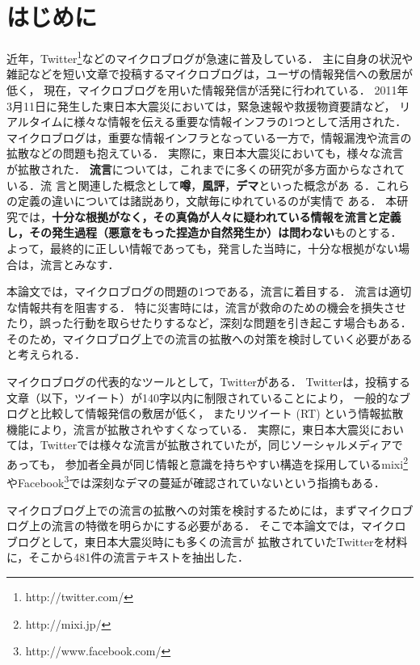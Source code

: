 \documentclass[japanese]{jnlp_1.4}
\begin{document}
\maketitle


\section{はじめに}\label{sec:intro}

近年，Twitter\footnote{http://twitter.com/}などのマイクロブログが急速に普及している．
主に自身の状況や雑記などを短い文章で投稿するマイクロブログは，ユーザの情報発信への敷居が低く，
現在，マイクロブログを用いた情報発信が活発に行われている．
2011年3月11日に発生した東日本大震災においては，緊急速報や救援物資要請など，
リアルタイムに様々な情報を伝える重要な情報インフラの1つとして活用された\cite{Book_Hakusho,Article_Nishitani,Book_Tachiiri}．
マイクロブログは，重要な情報インフラとなっている一方で，情報漏洩や流言の拡散などの問題も抱えている．
実際に，東日本大震災においても，様々な流言が拡散された\cite{Book_Ogiue}．
{\bf 流言}については，これまでに多くの研究が多方面からなされている．流
言と関連した概念として{\bf 噂}，{\bf 風評}，{\bf デマ}といった概念があ
る．これらの定義の違いについては諸説あり，文献毎にゆれているのが実情で
ある．
本研究では，{\bf 十分な根拠がなく，その真偽が人々に疑われている情報を流言と定義し，その発生過程（悪意をもった捏造か自然発生か）は問わない}ものとする．
よって，最終的に正しい情報であっても，発言した当時に，十分な根拠がない場合は，流言とみなす．

本論文では，マイクロブログの問題の1つである，流言に着目する．
流言は適切な情報共有を阻害する．
特に災害時には，流言が救命のための機会を損失させたり，誤った行動を取らせたりするなど，深刻な問題を引き起こす場合もある．
そのため，マイクロブログ上での流言の拡散への対策を検討していく必要があると考えられる．

マイクロブログの代表的なツールとして，Twitterがある．
Twitterは，投稿する文章（以下，ツイート）が140字以内に制限されていることにより，
一般的なブログと比較して情報発信の敷居が低く\cite{Article_Tarumi}，
またリツイート (RT) という情報拡散機能により，流言が拡散されやすくなっている．
実際に，東日本大震災においては，Twitterでは様々な流言が拡散されていたが，同じソーシャルメディアであっても，
参加者全員が同じ情報と意識を持ちやすい構造を採用しているmixi\footnote{http://mixi.jp/}やFacebook\footnote{http://www.facebook.com/}では深刻なデマの蔓延が確認されていないという指摘もある\cite{Book_Kobayashi}．


マイクロブログ上での流言の拡散への対策を検討するためには，まずマイクロブログ上の流言の特徴を明らかにする必要がある．
そこで本論文では，マイクロブログとして，東日本大震災時にも多くの流言が
拡散されていたTwitterを材料に，そこから481件の流言テキストを抽出した．
\end{document}
